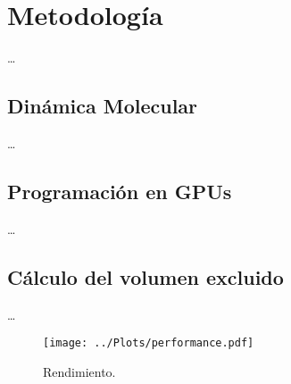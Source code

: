 \chapter{Metodología}
\label{cap:methodology}

\dots

\section{Dinámica Molecular}

\dots

\section{Programación en GPUs}

\cite{Wilt2013}

\dots

\section{Cálculo del volumen excluido}

\dots

\begin{figure}
  \centering
  \texttt{[image: ../Plots/performance.pdf]}
  \caption{Rendimiento.}
  \label{fig:performance}
\end{figure}
